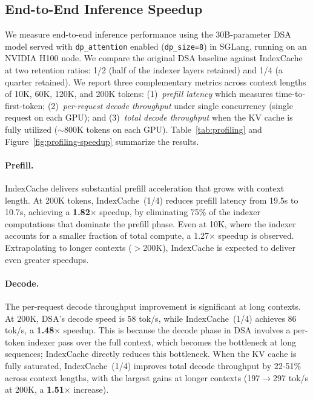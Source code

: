 \subsection{End-to-End Inference Speedup}
\label{sec:exp-profiling}
We measure end-to-end inference performance using the 30B-parameter DSA model served with \texttt{dp\_attention} enabled (\texttt{dp\_size=8}) in SGLang, running on an NVIDIA H100 node.
We compare the original DSA baseline against IndexCache at two retention ratios: 1/2 (half of the indexer layers retained) and 1/4 (a quarter retained).
We report three complementary metrics across context lengths of 10K, 60K, 120K, and 200K tokens:
(1)~\emph{prefill latency} which measures time-to-first-token;
(2)~\emph{per-request decode throughput} under single concurrency (single request on each GPU);
and (3)~\emph{total decode throughput} when the KV cache is fully utilized (${\sim}$800K tokens on each GPU).
Table~\ref{tab:profiling} and Figure~\ref{fig:profiling-speedup} summarize the results.

\paragraph{Prefill.}
IndexCache delivers substantial prefill acceleration that grows with context length.
At 200K tokens, IndexCache~(1/4) reduces prefill latency from 19.5s to 10.7s, achieving a \textbf{1.82$\times$} speedup, by eliminating 75\% of the indexer computations that dominate the prefill phase.
Even at 10K, where the indexer accounts for a smaller fraction of total compute, a 1.27$\times$ speedup is observed.
Extrapolating to longer contexts ($>$200K), IndexCache is expected to deliver even greater speedups.

\paragraph{Decode.}
The per-request decode throughput improvement is significant at long contexts.
At 200K, DSA's decode speed is 58 tok/s, while IndexCache~(1/4) achieves 86 tok/s, a \textbf{1.48$\times$} speedup.
This is because the decode phase in DSA involves a per-token indexer pass over the full context, which becomes the bottleneck at long sequences; IndexCache directly reduces this bottleneck.
When the KV cache is fully saturated, IndexCache~(1/4) improves total decode throughput by 22-51\% across context lengths, with the largest gains at longer contexts (197$\to$297 tok/s at 200K, a \textbf{1.51$\times$} increase).

